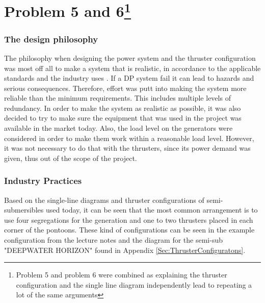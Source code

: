 \newpage
\section*{Problem 5 and 6\footnote{Problem 5 and problem 6 were combined as explaining the thruster configuration and the single line diagram independently lead to repeating a lot of the same arguments}} \label{prob_5and6}


 \subsubsection*{The design philosophy}\label{Sec:designPhilosophy}
The philosophy when designing the power system and the thruster configuration was most off all to make a system that is realistic, in accordance to the applicable standards and the industry uses . If a DP system fail it can lead to hazards and serious consequences. Therefore, effort was putt into making the system more reliable than the minimum requirements. This includes multiple levels of redundancy. In order to make the system as realistic as possible, it was also decided to try to make sure the equipment that was used in the project was available in the market today. Also, the load level on the generators were considered in order to make them work within a reasonable load level. However, it was not necessary to do that with the thrusters, since its power demand was given, thus out of the scope of the project. 


\subsubsection*{Industry Practices} \label{Sec:industryPractices}
Based on the single-line diagrams and thruster configurations of semi-submersibles used today, it can be seen that the most common arrangement is to use four segregations for the generation and one to two thrusters placed in each corner of the pontoons. These kind of configurations can be seen in the example configuration from the lecture notes and the diagram for the semi-sub "DEEPWATER HORIZON" found in Appendix \ref{Sec:ThrusterConfiguratons}.  


